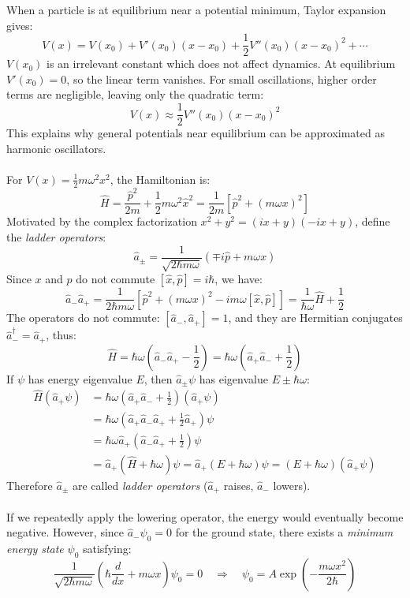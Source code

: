 When a particle is at equilibrium near a potential minimum, Taylor expansion gives:
\[
V(x) = V(x_0) + V'(x_0)(x - x_0) + \frac{1}{2}V''(x_0)(x - x_0)^2 + \cdots
\]
$V(x_0)$ is an irrelevant constant which does not affect dynamics. At equilibrium $V'(x_0) = 0$, so the linear term vanishes. For small oscillations, higher order terms are negligible, leaving only the quadratic term:
\[V(x) \approx \frac{1}{2}V''(x_0)(x - x_0)^2\]
This explains why general potentials near equilibrium can be approximated as harmonic oscillators.\\ \\
For $V(x) = \frac{1}{2}m\omega^2x^2$, the Hamiltonian is:
\[
\hat{H} = \frac{\hat{p}^2}{2m} + \frac{1}{2}m\omega^2\hat{x}^2 = \frac{1}{2m}\left[\hat{p}^2 + (m\omega x)^2\right]
\]
Motivated by the complex factorization $x^2 + y^2 = (ix + y)(-ix + y)$, define the \emph{ladder operators}:
\[
\hat{a}_{\pm} = \frac{1}{\sqrt{2\hbar m\omega}}\left(\mp i\hat{p} + m\omega x\right)
\]
Since $x$ and $p$ do not commute $[\hat{x}, \hat{p}] = i\hbar$, we have:
\[
\hat{a}_-\hat{a}_+ = \frac{1}{2\hbar m\omega}\left[\hat{p}^2 + (m\omega x)^2 - im\omega[\hat{x}, \hat{p}]\right] = \frac{1}{\hbar\omega}\hat{H} + \frac{1}{2}
\]
The operators do not commute: $[\hat{a}_-, \hat{a}_+] = 1$, and they are Hermitian conjugates $\hat{a}_-^\dagger = \hat{a}_+$, thus:
\[\hat{H} = \hbar\omega\left(\hat{a}_-\hat{a}_+ - \frac{1}{2}\right) = \hbar\omega\left(\hat{a}_+\hat{a}_- + \frac{1}{2}\right)\]
If $\psi$ has energy eigenvalue $E$, then $\hat{a}_\pm\psi$ has eigenvalue $E \pm \hbar\omega$:
\begin{align*}
\hat{H}(\hat{a}_+\psi) &= \hbar\omega\left(\hat{a}_+\hat{a}_- + \frac{1}{2}\right)(\hat{a}_+\psi) \\
&= \hbar\omega\left(\hat{a}_+\hat{a}_-\hat{a}_+ + \frac{1}{2}\hat{a}_+\right)\psi \\
&= \hbar\omega\hat{a}_+\left(\hat{a}_-\hat{a}_+ + \frac{1}{2}\right)\psi \\
&= \hat{a}_+(\hat{H} + \hbar\omega)\psi = \hat{a}_+(E + \hbar\omega)\psi = (E + \hbar\omega)(\hat{a}_+\psi)
\end{align*}
Therefore $\hat{a}_\pm$ are called \emph{ladder operators} ($\hat{a}_+$ raises, $\hat{a}_-$ lowers).\\ \\
If we repeatedly apply the lowering operator, the energy would eventually become negative. However, since $\hat{a}_-\psi_0 = 0$ for the ground state, there exists a \emph{minimum energy state} $\psi_0$ satisfying:
\[
\frac{1}{\sqrt{2\hbar m\omega}}\left(\hbar\frac{d}{dx} + m\omega x\right)\psi_0 = 0 \quad \Rightarrow \quad \psi_0 = A\exp\left(-\frac{m\omega x^2}{2\hbar}\right)
\]
